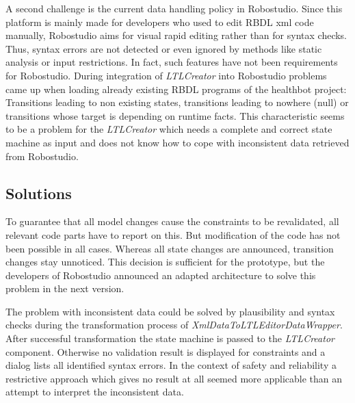 A second challenge is the current data handling policy in Robostudio. Since this platform is mainly made for developers who used to edit RBDL xml code manually, Robostudio aims for visual rapid editing rather than for syntax checks. Thus, syntax errors are not detected or even ignored by methods like static analysis or input restrictions. In fact, such features have not been requirements for Robostudio. During integration of \emph{LTLCreator} into Robostudio problems came up when loading already existing RBDL programs of the healthbot project: Transitions leading to non existing states, transitions leading to nowhere (null) or transitions whose target is depending on runtime facts.
This characteristic seems to be a problem for the \emph{LTLCreator} which needs a complete and correct state machine as input and does not know how to cope with inconsistent data retrieved from Robostudio.




\subsection{Solutions}

To guarantee that all model changes cause the constraints to be revalidated, all relevant code parts have to report on this. But modification of the code has not been possible in all cases. Whereas all state changes are announced, transition changes stay unnoticed. This decision is sufficient for the prototype, but the developers of Robostudio announced an adapted architecture to solve this problem in the next version.


The problem with inconsistent data could be solved by plausibility and syntax checks during the transformation process of \emph{XmlDataToLTLEditorDataWrapper}. After successful transformation the state machine is passed to the \emph{LTLCreator} component. Otherwise no validation result is displayed for constraints and a dialog lists all identified syntax errors. In the context of safety and reliability a restrictive approach which gives no result at all seemed more applicable than an attempt to interpret the inconsistent data. 